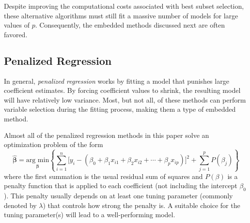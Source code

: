 \documentclass[final,onefignum,onetabnum]{siuro210301}
\newcommand{\argmin}[2]{\underset{#1}{\text{arg min}}\left\{#2\right\}}
\begin{document}
	Despite improving the computational costs associated with best subset selection, these alternative algorithms must still fit a massive number of models for large values of $p$. Consequently, the embedded methods discussed next are often favored. 
	
	\subsection{Penalized Regression}
	
	In general, \textit{penalized regression} works by fitting a model that punishes large coefficient estimates. By forcing coefficient values to shrink, the resulting model will have relatively low variance. Most, but not all, of these methods can perform variable selection during the fitting process, making them a type of embedded method.
	
	Almost all of the penalized regression methods in this paper solve an optimization problem of the form
	\begin{equation}\label{eqn:penalized-regression-lambda}
		\hat{\bm{\beta}}=\argmin{\bm{\beta}}{\sum\limits_{i = 1}^n \Big[y_i - (\beta_0 + \beta_1 x_{i1} + \beta_2 x_{i2} + \cdots + \beta_p x_{ip})\Big]^2 + \sum\limits_{j = 1}^p P(\beta_j)}
	\end{equation}
	where the first summation is the usual residual sum of squares and $P(\beta)$ is a penalty function that is applied to each coefficient (not including the intercept $\beta_0$). This penalty usually depends on at least one tuning parameter (commonly denoted by $\lambda$) that controls how strong the penalty is. A suitable choice for the tuning parameter(s) will lead to a well-performing model.

	
\end{document}
